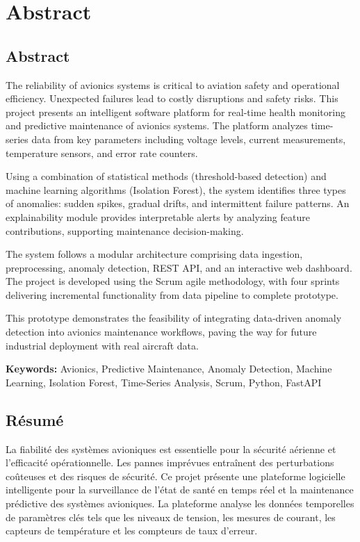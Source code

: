 \chapter*{Abstract}

\section*{Abstract}
The reliability of avionics systems is critical to aviation safety and operational efficiency. Unexpected failures lead to costly disruptions and safety risks. This project presents an intelligent software platform for real-time health monitoring and predictive maintenance of avionics systems. The platform analyzes time-series data from key parameters including voltage levels, current measurements, temperature sensors, and error rate counters.

Using a combination of statistical methods (threshold-based detection) and machine learning algorithms (Isolation Forest), the system identifies three types of anomalies: sudden spikes, gradual drifts, and intermittent failure patterns. An explainability module provides interpretable alerts by analyzing feature contributions, supporting maintenance decision-making.

The system follows a modular architecture comprising data ingestion, preprocessing, anomaly detection, REST API, and an interactive web dashboard. The project is developed using the Scrum agile methodology, with four sprints delivering incremental functionality from data pipeline to complete prototype.

This prototype demonstrates the feasibility of integrating data-driven anomaly detection into avionics maintenance workflows, paving the way for future industrial deployment with real aircraft data.

\textbf{Keywords:} Avionics, Predictive Maintenance, Anomaly Detection, Machine Learning, Isolation Forest, Time-Series Analysis, Scrum, Python, FastAPI

\bigskip
\section*{Résumé}
La fiabilité des systèmes avioniques est essentielle pour la sécurité aérienne et l'efficacité opérationnelle. Les pannes imprévues entraînent des perturbations coûteuses et des risques de sécurité. Ce projet présente une plateforme logicielle intelligente pour la surveillance de l'état de santé en temps réel et la maintenance prédictive des systèmes avioniques. La plateforme analyse les données temporelles de paramètres clés tels que les niveaux de tension, les mesures de courant, les capteurs de température et les compteurs de taux d'erreur.

